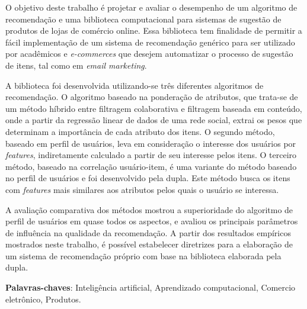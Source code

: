 \setlength{\absparsep}{18pt} %
\begin{resumo}
O objetivo deste trabalho é projetar e avaliar o desempenho de um algoritmo de recomendação e uma biblioteca computacional para sistemas de sugestão de produtos de lojas de comércio online. Essa biblioteca tem finalidade de permitir a fácil implementação de um sistema de recomendação genérico para ser utilizado por acadêmicos e \textit{e-commerces} que desejem automatizar o processo de sugestão de itens, tal como em \textit{email marketing}. 

A biblioteca foi desenvolvida utilizando-se três diferentes algoritmos de recomendação. O algoritmo baseado na ponderação de atributos, que trata-se de um método híbrido entre filtragem colaborativa e filtragem baseada em conteúdo, onde a partir da regressão linear de dados de uma rede social, extrai os pesos que determinam a importância de cada atributo dos itens. O segundo método, baseado em perfil de usuários, leva em consideração o interesse dos usuários por \textit{features}, indiretamente calculado a partir de seu interesse pelos itens. O terceiro método, baseado na correlação usuário-item, é uma variante do método baseado no perfil de usuários e foi desenvolvido pela dupla. Este método busca os itens com \textit{features} mais similares aos atributos pelos quais o usuário se interessa.

A avaliação comparativa dos métodos mostrou a superioridade do algoritmo de perfil de usuários em quase todos os aspectos, e avaliou os principais parâmetros de influência na qualidade da recomendação. A partir dos resultados empíricos mostrados neste trabalho, é possível estabelecer diretrizes para a elaboração de um sistema de recomendação próprio com base na biblioteca elaborada pela dupla.

\textbf{Palavras-chaves}: Inteligência artificial, Aprendizado computacional, Comercio eletrônico, Produtos.
\end{resumo}